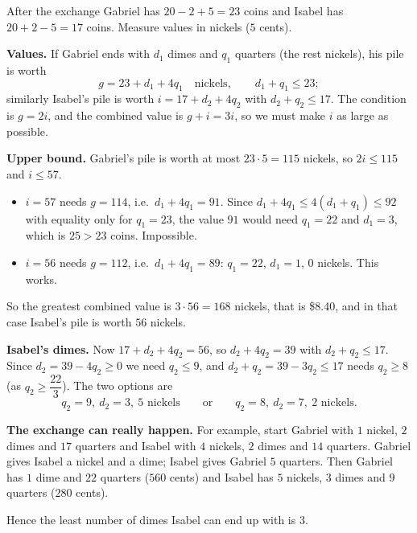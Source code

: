 After the exchange Gabriel has $20-2+5=23$ coins and Isabel has $20+2-5=17$ coins. Measure values in nickels ($5$ cents).

\textbf{Values.} If Gabriel ends with $d_1$ dimes and $q_1$ quarters (the rest nickels), his pile is worth
\[
g=23+d_1+4q_1\quad\text{nickels},\qquad d_1+q_1\le23 ;
\]
similarly Isabel's pile is worth $i=17+d_2+4q_2$ with $d_2+q_2\le17$. The condition is $g=2i$, and the combined value is $g+i=3i$, so we must make $i$ as large as possible.

\textbf{Upper bound.} Gabriel's pile is worth at most $23\cdot5=115$ nickels, so $2i\le115$ and $i\le57$.
\begin{itemize}
\item $i=57$ needs $g=114$, i.e.\ $d_1+4q_1=91$. Since $d_1+4q_1\le 4(d_1+q_1)\le92$ with equality only for $q_1=23$, the value $91$ would need $q_1=22$ and $d_1=3$, which is $25>23$ coins. Impossible.
\item $i=56$ needs $g=112$, i.e.\ $d_1+4q_1=89$: $q_1=22$, $d_1=1$, $0$ nickels. This works.
\end{itemize}
So the greatest combined value is $3\cdot56=168$ nickels, that is \$8.40, and in that case Isabel's pile is worth $56$ nickels.

\textbf{Isabel's dimes.} Now $17+d_2+4q_2=56$, so $d_2+4q_2=39$ with $d_2+q_2\le17$. Since $d_2=39-4q_2\ge0$ we need $q_2\le9$, and $d_2+q_2=39-3q_2\le17$ needs $q_2\ge8$ (as $q_2\ge\dfrac{22}{3}$). The two options are
\[
q_2=9,\ d_2=3,\ 5\text{ nickels}\qquad\text{or}\qquad q_2=8,\ d_2=7,\ 2\text{ nickels}.
\]

\textbf{The exchange can really happen.} For example, start Gabriel with $1$ nickel, $2$ dimes and $17$ quarters and Isabel with $4$ nickels, $2$ dimes and $14$ quarters. Gabriel gives Isabel a nickel and a dime; Isabel gives Gabriel $5$ quarters. Then Gabriel has $1$ dime and $22$ quarters ($560$ cents) and Isabel has $5$ nickels, $3$ dimes and $9$ quarters ($280$ cents).

Hence the least number of dimes Isabel can end up with is $\boxed{3}$.
